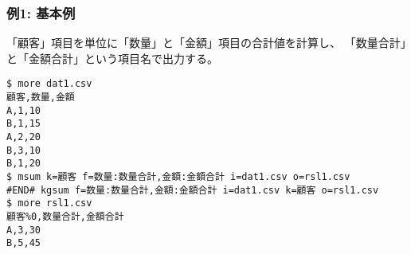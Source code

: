 \subsubsection*{例1: 基本例}

「顧客」項目を単位に「数量」と「金額」項目の合計値を計算し、
「数量合計」と「金額合計」という項目名で出力する。


\begin{Verbatim}[baselinestretch=0.7,frame=single]
$ more dat1.csv
顧客,数量,金額
A,1,10
B,1,15
A,2,20
B,3,10
B,1,20
$ msum k=顧客 f=数量:数量合計,金額:金額合計 i=dat1.csv o=rsl1.csv
#END# kgsum f=数量:数量合計,金額:金額合計 i=dat1.csv k=顧客 o=rsl1.csv
$ more rsl1.csv
顧客%0,数量合計,金額合計
A,3,30
B,5,45
\end{Verbatim}
